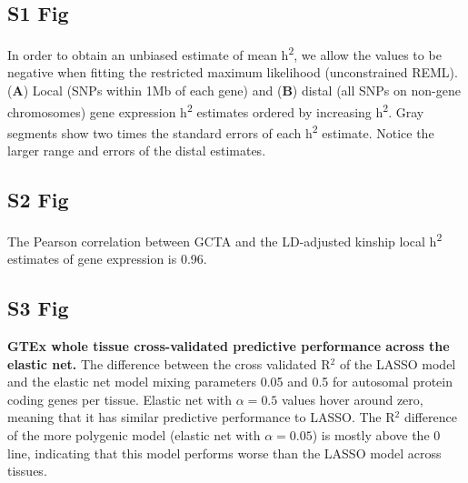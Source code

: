\documentclass[10pt,letterpaper]{article}
\begin{document}
\begin{singlespace}

\subsection*{S1 Fig}
\label{S1_Fig}

In order to obtain an unbiased estimate of mean h\textsuperscript{2}, we allow the values to be negative when fitting the restricted maximum likelihood (unconstrained REML). (\textbf{A}) Local (SNPs within 1Mb of each gene) and (\textbf{B}) distal (all SNPs on non-gene chromosomes) gene expression h\textsuperscript{2} estimates ordered by increasing h\textsuperscript{2}. Gray segments show two times the standard errors of each h\textsuperscript{2} estimate. Notice the larger range and errors of the distal estimates.

\pagebreak

\subsection*{S2 Fig}
\label{S2_Fig}

 The Pearson correlation between GCTA and the LD-adjusted kinship local h\textsuperscript{2} estimates of gene expression is 0.96.

\subsection*{S3 Fig}
\label{S3_Fig}
{\bf GTEx whole tissue cross-validated predictive performance across the elastic net.} The difference between the cross validated R$^2$ of the LASSO model and the elastic net model mixing parameters 0.05 and 0.5 for autosomal protein coding genes per tissue. Elastic net with $\alpha=0.5$ values hover around zero, meaning that it has similar predictive performance to LASSO. The R$^2$ difference of the more polygenic model (elastic net with $\alpha=0.05$) is mostly above the 0 line, indicating that this model performs worse than the LASSO model across tissues.


\end{singlespace}
\end{document}
